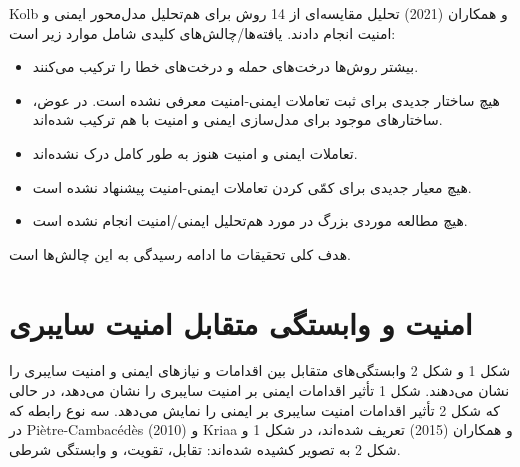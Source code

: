 \documentclass[a4paper,10pt]{article}
\begin{document}
        Kolb و همکاران (2021) تحلیل مقایسه‌ای از 14 روش برای هم‌تحلیل مدل‌محور ایمنی و امنیت انجام دادند. یافته‌ها/چالش‌های کلیدی شامل موارد زیر است:

        \begin{itemize}
            
            \item بیشتر روش‌ها درخت‌های حمله و درخت‌های خطا را ترکیب می‌کنند.

            \item هیچ ساختار جدیدی برای ثبت تعاملات ایمنی-امنیت معرفی نشده است. در عوض، ساختارهای موجود برای مدل‌سازی ایمنی و امنیت با هم ترکیب شده‌اند.

            \item تعاملات ایمنی و امنیت هنوز به طور کامل درک نشده‌اند.

            \item هیچ معیار جدیدی برای کمّی کردن تعاملات ایمنی-امنیت پیشنهاد نشده است.

            \item هیچ مطالعه موردی بزرگ در مورد هم‌تحلیل ایمنی/امنیت انجام نشده است.

        \end{itemize}

        هدف کلی تحقیقات ما ادامه رسیدگی به این چالش‌ها است.

    \section{امنیت و وابستگی متقابل امنیت سایبری}

        شکل 1 و شکل 2 وابستگی‌های متقابل بین اقدامات و نیازهای ایمنی و امنیت سایبری را نشان می‌دهند. شکل 1 تأثیر اقدامات ایمنی بر امنیت سایبری را نشان می‌دهد، در حالی که شکل 2 تأثیر اقدامات امنیت سایبری بر ایمنی را نمایش می‌دهد. سه نوع رابطه که در Piètre-Cambacédès (2010) و Kriaa و همکاران (2015) تعریف شده‌اند، در شکل 1 و شکل 2 به تصویر کشیده شده‌اند: تقابل، تقویت، و وابستگی شرطی.
\end{document}

